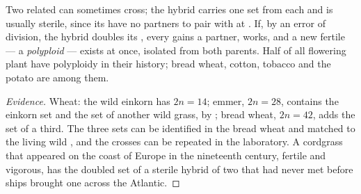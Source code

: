 \begin{proposition}\label{prop:g12:diversification-of-life:polyploidy}
Two related  can sometimes cross; the hybrid carries one
 set from each and is usually sterile, since its 
have no partners to pair with at . If, by an error of division,
the hybrid doubles its , every  gains a partner,
 works, and a new fertile  --- a \emph{polyploid}
--- exists at once, isolated from both parents. Half of all flowering
plant  have polyploidy in their history; bread wheat, cotton,
tobacco and the potato are among them.
\end{proposition}
\begin{proof}[Evidence]
Wheat: the wild einkorn has $2n = 14$; emmer, $2n = 28$, contains the
einkorn set and the set of another wild grass,  by
; bread wheat, $2n = 42$, adds the set of a third. The three
sets can be identified in the bread wheat  and matched to the
living wild , and the crosses can be repeated in the
laboratory. A cordgrass that appeared on the coast of Europe in the
nineteenth century, fertile and vigorous, has the doubled 
set of a sterile hybrid of two  that had never met before ships
brought one across the Atlantic.
\end{proof}


